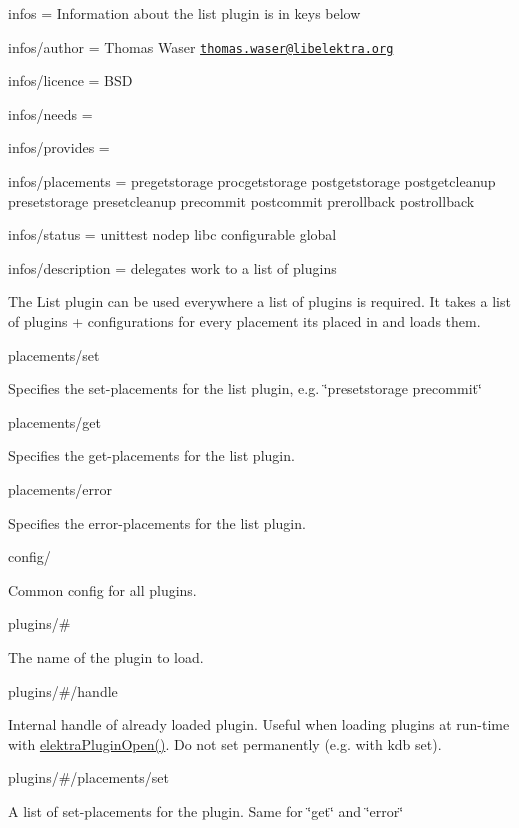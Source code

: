 
\begin{DoxyItemize}
\item infos = Information about the list plugin is in keys below
\item infos/author = Thomas Waser \href{mailto:thomas.waser@libelektra.org}{\tt thomas.\+waser@libelektra.\+org}
\item infos/licence = B\+SD
\item infos/needs =
\item infos/provides =
\item infos/placements = pregetstorage procgetstorage postgetstorage postgetcleanup presetstorage presetcleanup precommit postcommit prerollback postrollback
\item infos/status = unittest nodep libc configurable global
\item infos/description = delegates work to a list of plugins
\end{DoxyItemize}

The List plugin can be used everywhere a list of plugins is required. It takes a list of plugins + configurations for every placement it\textquotesingle{}s placed in and loads them.

{\ttfamily placements/set}

Specifies the set-\/placements for the list plugin, e.\+g. \char`\"{}presetstorage precommit\char`\"{}

{\ttfamily placements/get}

Specifies the get-\/placements for the list plugin.

{\ttfamily placements/error}

Specifies the error-\/placements for the list plugin.

{\ttfamily config/}

Common config for all plugins.

{\ttfamily plugins/\#}

The name of the plugin to load.

{\ttfamily plugins/\#/handle}

Internal handle of already loaded plugin. Useful when loading plugins at run-\/time with {\ttfamily \hyperlink{elektra_2plugin_8c_a32a70a7876542c51d153164ac5108a57}{elektra\+Plugin\+Open()}}. Do not set permanently (e.\+g. with {\ttfamily kdb set}).

{\ttfamily plugins/\#/placements/set}

A list of set-\/placements for the plugin. Same for \char`\"{}get\char`\"{} and \char`\"{}error\char`\"{}

